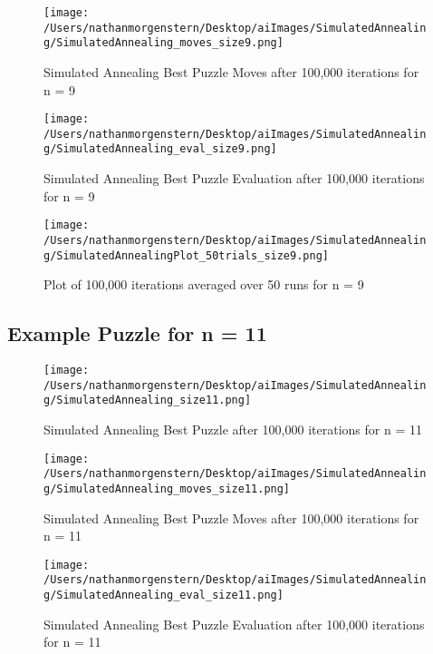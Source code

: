 \documentclass{report}
\begin{document}
	\begin{figure}[H]
	\centering
	\texttt{[image: /Users/nathanmorgenstern/Desktop/aiImages/SimulatedAnnealing/SimulatedAnnealing\_moves\_size9.png]}
	\caption{Simulated Annealing Best Puzzle Moves after 100,000 iterations for n = 9} 
	\label{fig: Simulated Annealing Best Puzzle Moves after 100,000 iterations for n = 9}
	\end{figure}

	\begin{figure}[H]
	\centering
	\texttt{[image: /Users/nathanmorgenstern/Desktop/aiImages/SimulatedAnnealing/SimulatedAnnealing\_eval\_size9.png]}
	\caption{Simulated Annealing Best Puzzle Evaluation after 100,000 iterations for n = 9} 
	\label{fig: Simulated Annealing Best Puzzle Evaluation after 100,000 iterations for n = 9} 
	\end{figure}

	\begin{figure}[H]
	\centering
	\texttt{[image: /Users/nathanmorgenstern/Desktop/aiImages/SimulatedAnnealing/SimulatedAnnealingPlot\_50trials\_size9.png]}
	\caption{Plot of 100,000 iterations averaged over 50 runs for n = 9}
	\label{fig: Plot of 100,000 iterations averaged over 50 runs for n = 9}
	\end{figure}

\subsection{Example Puzzle for n = 11}
	\begin{figure}[H]
	\centering
	\texttt{[image: /Users/nathanmorgenstern/Desktop/aiImages/SimulatedAnnealing/SimulatedAnnealing\_size11.png]}
	\caption{Simulated Annealing Best Puzzle after 100,000 iterations for n = 11} 
	\label{fig: Simulated Annealing Best Puzzle after 100,000 iterations for n = 11}
	\end{figure}
	
	\begin{figure}[H]
	\centering
	\texttt{[image: /Users/nathanmorgenstern/Desktop/aiImages/SimulatedAnnealing/SimulatedAnnealing\_moves\_size11.png]}
	\caption{Simulated Annealing Best Puzzle Moves after 100,000 iterations for n = 11} 
	\label{fig: Simulated Annealing Best Puzzle Moves after 100,000 iterations for n = 11}
	\end{figure}

	\begin{figure}[H]
	\centering
	\texttt{[image: /Users/nathanmorgenstern/Desktop/aiImages/SimulatedAnnealing/SimulatedAnnealing\_eval\_size11.png]}
	\caption{Simulated Annealing Best Puzzle Evaluation after 100,000 iterations for n = 11} 
	\label{fig: Simulated Annealing Best Puzzle Evaluation after 100,000 iterations for n = 11} 
	\end{figure}
\end{document}
